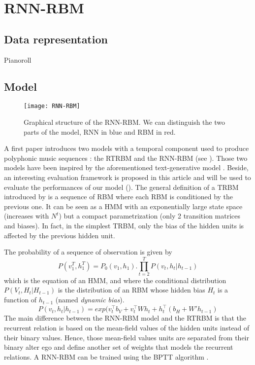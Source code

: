\documentclass{report}
\begin{document}
\section{RNN-RBM}
\subsection{Data representation}
Pianoroll
\subsection{Model}
\begin{figure}
\centering
\texttt{[image: RNN-RBM]}
\caption{Graphical structure of the RNN-RBM. We can distinguish the two parts of the model, RNN in blue and RBM in red.}
\label{fig:RNN-RBM}
\end{figure}
A first paper \cite{boulanger2012modeling} introduces two models with a temporal component used to produce polyphonic music sequences : the \gls*{RTRBM} and the \gls*{RNN-RBM} (see ). Those two models have been inspired by the aforementioned text-generative model \cite{sutskever2011generating}. Beside, an interesting evaluation framework is proposed in this article and will be used to evaluate the performances of our model ().
The general definition of a \gls*{TRBM} introduced by \cite{sutskever2009recurrent} is a sequence of \gls*{RBM} where each \gls*{RBM} is conditioned by the previous one. It can be seen as a HMM with an exponentially large state space (increases with $N^{t}$) but a compact parametrization (only 2 transition matrices and biases). In fact, in the simplest \gls*{TRBM}, only the bias of the hidden units is affected by the previous hidden unit.

The probability of a sequence of observation is given by
\begin{equation}
P(v_{1}^{T},h_{1}^{T}) = P_{0}(v_{1},h_{1}) . \prod_{t=2}^{T} P(v_{t},h_{t}|h_{t-1})
\end{equation}
which is the equation of an HMM, and where the conditional distribution $P(V_{t},H_{t}|H_{t-1})$ is the distribution of an \gls*{RBM} whose hidden bias $H_{t}$ is a function of $h_{t-1}$ (named \textit{dynamic bias}).
\begin{equation}
P(v_{t},h_{t}|h_{t-1}) = exp(v_{t}^{\top}b_{V} + v_{t}^{\top} W h_{t} + h_{t}^{\top}(b_{H} + W'h_{t-1})
\end{equation}
The main difference between the \gls*{RNN-RBM} model and the \gls*{RTRBM} is that the recurrent relation is based on the mean-field values of the hidden units instead of their binary values. Hence, those mean-field values units are separated from their binary alter ego and define another set of weights that models the recurrent relations.
A \gls*{RNN-RBM} can be trained using the \gls*{BPTT} algorithm \cite{rumelhart1985learning}.
\end{document}
